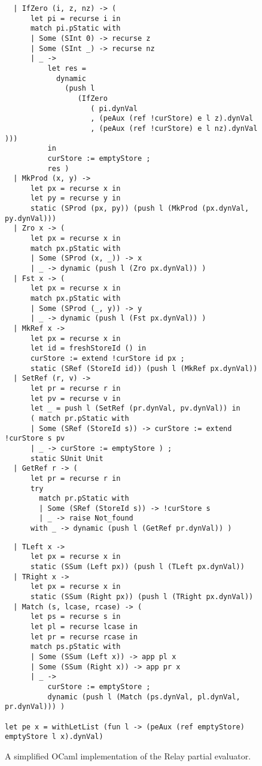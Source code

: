 \begin{figure}[H]
\ContinuedFloat
\begin{verbatim}
  | IfZero (i, z, nz) -> (
      let pi = recurse i in
      match pi.pStatic with
      | Some (SInt 0) -> recurse z
      | Some (SInt _) -> recurse nz
      | _ ->
          let res =
            dynamic
              (push l
                 (IfZero
                    ( pi.dynVal
                    , (peAux (ref !curStore) e l z).dynVal
                    , (peAux (ref !curStore) e l nz).dynVal )))
          in
          curStore := emptyStore ;
          res )
  | MkProd (x, y) ->
      let px = recurse x in
      let py = recurse y in
      static (SProd (px, py)) (push l (MkProd (px.dynVal, py.dynVal)))
  | Zro x -> (
      let px = recurse x in
      match px.pStatic with
      | Some (SProd (x, _)) -> x
      | _ -> dynamic (push l (Zro px.dynVal)) )
  | Fst x -> (
      let px = recurse x in
      match px.pStatic with
      | Some (SProd (_, y)) -> y
      | _ -> dynamic (push l (Fst px.dynVal)) )
  | MkRef x ->
      let px = recurse x in
      let id = freshStoreId () in
      curStore := extend !curStore id px ;
      static (SRef (StoreId id)) (push l (MkRef px.dynVal))
  | SetRef (r, v) ->
      let pr = recurse r in
      let pv = recurse v in
      let _ = push l (SetRef (pr.dynVal, pv.dynVal)) in
      ( match pr.pStatic with
      | Some (SRef (StoreId s)) -> curStore := extend !curStore s pv
      | _ -> curStore := emptyStore ) ;
      static SUnit Unit
  | GetRef r -> (
      let pr = recurse r in
      try
        match pr.pStatic with
        | Some (SRef (StoreId s)) -> !curStore s
        | _ -> raise Not_found
      with _ -> dynamic (push l (GetRef pr.dynVal)) )
\end{verbatim}
\end{figure}

\begin{figure}[H]
\ContinuedFloat
\begin{verbatim}
  | TLeft x ->
      let px = recurse x in
      static (SSum (Left px)) (push l (TLeft px.dynVal))
  | TRight x ->
      let px = recurse x in
      static (SSum (Right px)) (push l (TRight px.dynVal))
  | Match (s, lcase, rcase) -> (
      let ps = recurse s in
      let pl = recurse lcase in
      let pr = recurse rcase in
      match ps.pStatic with
      | Some (SSum (Left x)) -> app pl x
      | Some (SSum (Right x)) -> app pr x
      | _ ->
          curStore := emptyStore ;
          dynamic (push l (Match (ps.dynVal, pl.dynVal, pr.dynVal))) )

let pe x = withLetList (fun l -> (peAux (ref emptyStore) emptyStore l x).dynVal)
\end{verbatim}

\caption{
  A simplified OCaml implementation of the Relay
    partial evaluator.
}
\label{ref:pe_code}
\end{figure}
